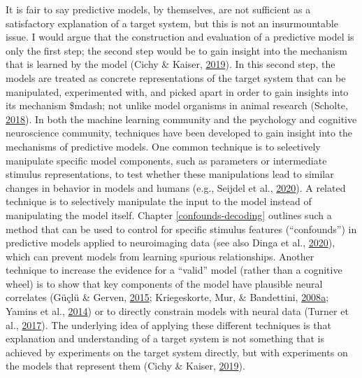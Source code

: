 \documentclass[11pt,american,a4paper,oneside,]{memoir} %
\begin{document}
It is fair to say predictive models, by themselves, are not sufficient as a satisfactory explanation of a target system, but this is not an insurmountable issue. I would argue that the construction and evaluation of a predictive model is only the first step; the second step would be to gain insight into the mechanism that is learned by the model (Cichy \& Kaiser, \protect\hyperlink{ref-Cichy2019-zf}{2019}). In this second step, the models are treated as concrete representations of the target system that can be manipulated, experimented with, and picked apart in order to gain insights into its mechanism \$mdash; not unlike model organisms in animal research (Scholte, \protect\hyperlink{ref-Scholte2018-he}{2018}). In both the machine learning community and the psychology and cognitive neuroscience community, techniques have been developed to gain insight into the mechanisms of predictive models. One common technique is to selectively manipulate specific model components, such as parameters or intermediate stimulus representations, to test whether these manipulations lead to similar changes in behavior in models and humans (e.g., Seijdel et al., \protect\hyperlink{ref-Seijdel2020-ff}{2020}). A related technique is to selectively manipulate the input to the model instead of manipulating the model itself. Chapter \ref{confounds-decoding} outlines such a method that can be used to control for specific stimulus features (``confounds'') in predictive models applied to neuroimaging data (see also Dinga et al., \protect\hyperlink{ref-Dinga2020-si}{2020}), which can prevent models from learning spurious relationships. Another technique to increase the evidence for a ``valid'' model (rather than a cognitive wheel) is to show that key components of the model have plausible neural correlates (Güçlü \& Gerven, \protect\hyperlink{ref-Guclu2015-qj}{2015}; Kriegeskorte, Mur, \& Bandettini, \protect\hyperlink{ref-Kriegeskorte2008-kv}{2008}\protect\hyperlink{ref-Kriegeskorte2008-kv}{a}; Yamins et al., \protect\hyperlink{ref-yamins2014performance}{2014}) or to directly constrain models with neural data (Turner et al., \protect\hyperlink{ref-Turner2017-fi}{2017}). The underlying idea of applying these different techniques is that explanation and understanding of a target system is not something that is achieved by experiments on the target system directly, but with experiments on the models that represent them (Cichy \& Kaiser, \protect\hyperlink{ref-Cichy2019-zf}{2019}).
\end{document}
